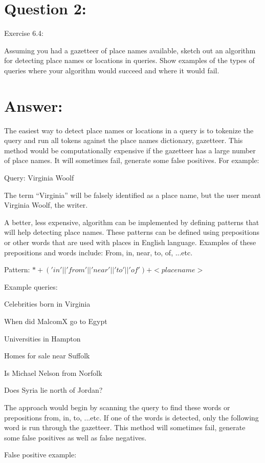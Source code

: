 \section*{Question 2:}
Exercise 6.4:

Assuming you had a gazetteer of place names available, sketch out an algorithm for detecting place names or locations in queries. Show examples of the types of queries where your algorithm would succeed and where it would fail.

\section*{Answer:}

The easiest way to detect place names or locations in a query is to tokenize the query and run all tokens against the place names dictionary, gazetteer. This method would be computationally expensive if the gazetteer has a large number of place names. It will sometimes fail, generate some false positives. For example:

Query: Virginia Woolf

The term ``Virginia'' will be falsely identified as a place name, but the user meant Virginia Woolf, the writer.

A better, less expensive, algorithm can be implemented by defining patterns that will help detecting place names. These patterns can be defined using prepositions or other words that are used with places in English language. Examples of these prepositions and words include: From, in, near, to, of, ...etc.

Pattern: $* + ('in' || 'from' || 'near' || 'to' || 'of' ) + <place name>$

Example queries:

Celebrities born in Virginia

When did MalcomX go to Egypt

Universities in Hampton

Homes for sale near Suffolk  

Is Michael Nelson from Norfolk

Does Syria lie north of Jordan?

The approach would begin by scanning the query to find these words or prepositions from, in, to, ...etc. If one of the words is detected, only the following word is run through the gazetteer. This method will sometimes fail, generate some false positives as well as false negatives. 

False positive example:

